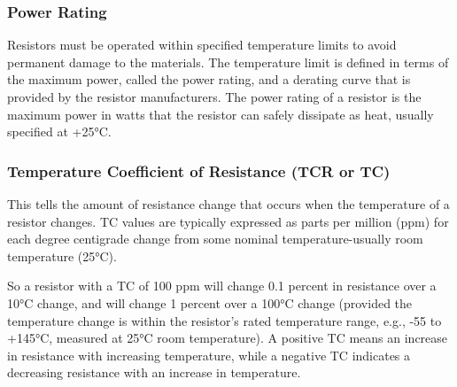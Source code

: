 \documentclass[../../document]{subfiles}
\begin{document}
\subsubsection{Power Rating}
Resistors must be operated within specified temperature limits to avoid
permanent damage to the materials. The temperature limit is defined in terms of
the maximum power, called the power rating, and a derating curve that is
provided by the resistor manufacturers. The power rating of a resistor is the
maximum power in watts that the resistor can safely dissipate as heat, usually
specified at +25\unit{\celsius}. \cite{practical_electronics}

\subsubsection{Temperature Coefficient of Resistance (TCR or TC)}
This tells the amount of resistance change that occurs when the temperature of
a resistor changes. TC values are typically expressed as parts per million
(ppm) for each degree centigrade change from some nominal temperature-usually
room temperature (25\unit{\celsius}). \cite{practical_electronics}

So a resistor with a TC of 100 ppm will change 0.1 percent in resistance over a
10\unit{\celsius} change, and will change 1 percent over a 100\unit{\celsius}
change (provided the temperature change is within the resistor’s rated
temperature range, e.g., -55 to +145\unit{\celsius}, measured at
25\unit{\celsius} room temperature). A positive TC means an increase in
resistance with increasing temperature, while a negative TC indicates a
decreasing resistance with an increase in temperature.
\cite{practical_electronics}
\end{document}

